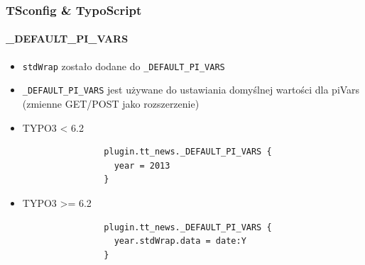 
\begin{frame}[fragile]
	\frametitle{TSconfig \& TypoScript}
	\framesubtitle{\_DEFAULT\_PI\_VARS}

	\begin{itemize}
		\item \texttt{stdWrap} zostało dodane do \texttt{\_DEFAULT\_PI\_VARS}
		\item \texttt{\_DEFAULT\_PI\_VARS} jest używane do ustawiania domyślnej wartości dla piVars (zmienne GET/POST jako rozszerzenie)

		\item TYPO3 < 6.2
			\begin{lstlisting}
				plugin.tt_news._DEFAULT_PI_VARS {
				  year = 2013
				}
			\end{lstlisting}

		\item TYPO3 >= 6.2
			\begin{lstlisting}
				plugin.tt_news._DEFAULT_PI_VARS {
				  year.stdWrap.data = date:Y
				}
			\end{lstlisting}

	\end{itemize}

\end{frame}


